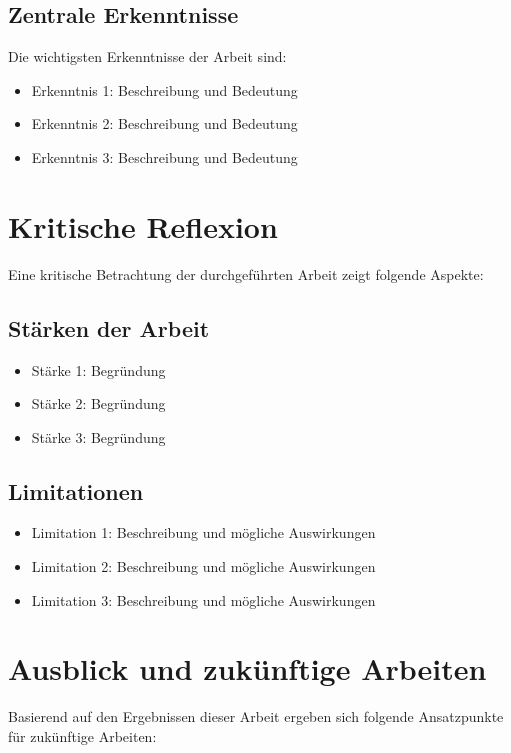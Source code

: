 \subsection{Zentrale Erkenntnisse}

Die wichtigsten Erkenntnisse der Arbeit sind:
\begin{itemize}
    \item Erkenntnis 1: Beschreibung und Bedeutung
    \item Erkenntnis 2: Beschreibung und Bedeutung
    \item Erkenntnis 3: Beschreibung und Bedeutung
\end{itemize}

\section{Kritische Reflexion}
\label{sec:reflexion}

Eine kritische Betrachtung der durchgeführten Arbeit zeigt folgende Aspekte:

\subsection{Stärken der Arbeit}
\begin{itemize}
    \item Stärke 1: Begründung
    \item Stärke 2: Begründung
    \item Stärke 3: Begründung
\end{itemize}

\subsection{Limitationen}
\begin{itemize}
    \item Limitation 1: Beschreibung und mögliche Auswirkungen
    \item Limitation 2: Beschreibung und mögliche Auswirkungen
    \item Limitation 3: Beschreibung und mögliche Auswirkungen
\end{itemize}

\section{Ausblick und zukünftige Arbeiten}
\label{sec:ausblick}

Basierend auf den Ergebnissen dieser Arbeit ergeben sich folgende Ansatzpunkte für zukünftige Arbeiten:

